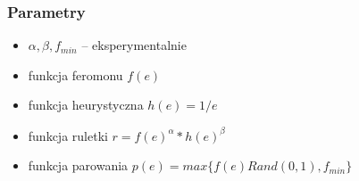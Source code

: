 \documentclass{beamer}
\begin{document}
\begin{frame}
\frametitle{Parametry}
\begin{itemize}

\item $\alpha, \beta, f_{min}$ -- eksperymentalnie
\item funkcja feromonu $f(e)$
\item funkcja heurystyczna $h(e) = 1/e$
\item funkcja ruletki $r = f(e)^\alpha * h(e)^\beta$ 
\item funkcja parowania $p(e) = max\{f(e) Rand(0,1), f_{min}\}$

\end{itemize}

\iffalse
1. Dla każdej mrówki wylosuj miasto początkowe \\
2. Niech każda mrówka przejdzie cykl Hamiltona w grafie: startując z miasta początkowego, przejdź do dotychczas nieodwiedzonego miasta posługując się funkcją rulteki, jednocześnie pamiętając dotychczas przebytą trasę. Gdy wszystkie miasta zostały odwiedzone powróć do punktu startowego.
3. Po zakończeniu trasy przez wszystkie mrówki dodaj na krawędzie, przez które przeszły wartość równą odwrotności długości przebytej drogi. \\
4. Jeśli w tej iteracji któraś z mrówek znalazła lepszą ścieżkę, to zapamiętaj to rozwiązanie.\\
5. Feromony na krawędziach przemnóż przez współczynnik parowania.\\
6. Wykasuj pamięć dla każdej z mrówek i zacznij kolejną iterację.\\
\fi

\end{frame}
\end{document}
